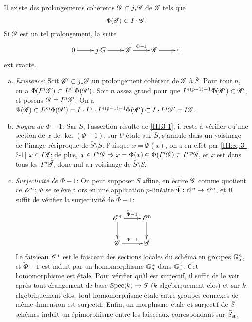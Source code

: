 \begin{lemma_}\label{III:3-3}
Il existe des prolongements coh\'erents $\bar{\mathscr{G}}\subset j_*\mathscr{G}$ de $\mathscr{G}$ tels 
que 
\begin{equation}\label{III:eq:3-3-1}
  \Phi(\bar{\mathscr{G}})\subset I\cdot \bar{\mathscr{G}}\text{.}
\end{equation}
Si $\bar{\mathscr{G}}$ est un tel prolongement, la suite 
\begin{equation}\label{III:eq:3-3-2}
\xymatrix{
  0 \ar[r] 
    & j_! G \ar[r] 
    & \bar\cG \ar[r]^-{\Phi-1} 
    & \bar\cG \ar[r] 
    & 0
}
\end{equation}
ext exacte.
\end{lemma_}
\begin{enumerate}[a)]
  \item \emph{Existence}: Soit $\mathscr{G}'\subset j_*\mathscr{G}$ un prolongement coh\'erent 
    de $\mathscr{G}$ \`a $\bar S$. Pour tout $n$, on a 
    $\Phi(I^n \mathscr{G}')\subset I^{p^n}\Phi(\mathscr{G}')$. Soit $n$ assez grand pour 
    que $I^{n(p-1)-1}\Phi(\mathscr{G}')\subset \mathscr{G}'$, et posons $\bar{\mathscr{G}}=I^n\mathscr{G}'$. 
    On a $\Phi(\bar{\mathscr{G}})\subset I^{p n}\Phi(\mathscr{G}') 
    =I\cdot I^n\cdot I^{n(p-1)-1}\Phi(\mathscr{G}')\subset I\cdot I^n\mathscr{G}' 
    = I\bar{\mathscr{G}}$. 
  \item \emph{Noyau de $\Phi-1$}: Sur $S$, l'assertion r\'esulte de 
    \ref{III:3-1}; il reste \`a v\'erifier qu'une section de $x$ de 
    $\ker(\Phi-1)$, sur $U$ \'etale sur $\bar S$, s'annule dans un voisinage de 
    l'image r\'eciproque de $\bar S\setminus S$. Puisque $x=\Phi(x)$, on a en 
    effet par \eqref{III:eq:3-3-1} $x\in I\bar{\mathscr{G}}$; de plus, 
    $x\in I^n\bar{\mathscr{G}}\Rightarrow x=\Phi(x)\in\Phi(I^n\bar{\mathscr{G}})\subset I^{n p}\bar{\mathscr{G}}$, et $x$ est dans tous les $I^n\bar{\mathscr{G}}$, donc nul au voisinage de 
    $\bar S\setminus S$.
  \item \emph{Surjectivit\'e de $\Phi-1$}: On peut supposer $\bar S$ affine, en 
    \'ecrire $\mathscr{G}$ comme quotient de $\mathscr{O}^n$; $\Phi$ se rel\`eve alors en une 
    application $p$-lin\'eaire $\widetilde\Phi:\mathscr{O}^n\to\mathscr{O}^n$, et il suffit de 
    v\'erifier la surjectivit\'e de $\widetilde\Phi-1$:
    \[\xymatrix{
      \cO^n \ar[r]^-{\widetilde \Phi-1} \ar[d] 
        & \cO^n \ar[d] \\
      \cG \ar[r]^-{\Phi-1} 
        & \cG 
    }\]
    Le faisceau $\mathscr{O}^n$ est le faisceau des sections locales du sch\'ema en 
    groupes $\mathbb{G}_a^n$, et $\widetilde\Phi-1$ est induit par un homomorphisme 
    $\mathbb{G}_a^n$ dans $\mathbb{G}_a^n$. Cet homomorphisme est \'etale. Pour v\'erifier 
    qu'il est surjectif, il suffit de le voir apr\`es tout changement de base 
    $\operatorname{Spec}(k)\to\bar S$ ($k$ alg\'ebriquement clos) et sur $k$ alg\'ebriquement 
    clos, tout homomorphisme \'etale entre groupes connexes de m\^eme dimension 
    est surjectif. Enfin, un morphisme \'etale et surjectif de 
    $\bar S$-sch\'emas induit un \'epimorphisme entre les faisceaux 
    correspondant sur ${\bar S}_{\textnormal{et}}$.
\end{enumerate}





